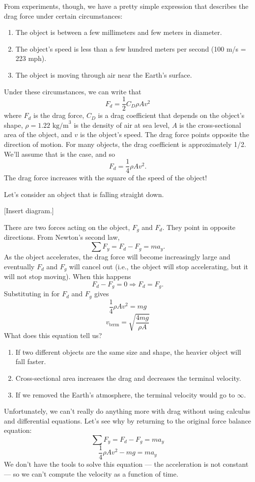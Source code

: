 From experiments, though, we have a pretty simple expression that describes the drag force under certain circumstances:
\begin{enumerate}
\item The object is between a few millimeters and few meters in diameter.
\item The object's speed is less than a few hundred meters per second (100 m/s = 223 mph).
\item The object is moving through air near the Earth's surface.
\end{enumerate}
Under these circumstances, we can write that
$$\boxed{F_d=\frac{1}{2}C_D\rho Av^2}$$
where $F_d$ is the drag force, $C_D$ is a drag coefficient that depends on the object's shape, $\rho=1.22\mbox{ kg/m}^3$ is the density of air at sea level, $A$ is the cross-sectional area of the object, and $v$ is the object's speed. The drag force points opposite the direction of motion. For many objects, the drag coefficient is approximately 1/2. We'll assume that is the case, and so
$$\boxed{F_d=\frac{1}{4}\rho Av^2}.$$
The drag force increases with the square of the speed of the object!

Let's consider an object that is falling straight down.

[Insert diagram.]
\vspace{5cm}

There are two forces acting on the object, $F_g$ and $F_d$. They point in opposite directions. From Newton's second law,
$$\sum F_y=F_d-F_g=ma_y.$$
As the object accelerates, the drag force will become increasingly large and eventually $F_d$ and $F_g$ will cancel out (i.e., the object will stop accelerating, but it will not stop moving). When this happens
$$F_d-F_g=0\Rightarrow F_d=F_g.$$
Substituting in for $F_d$ and $F_g$ gives
$$\frac{1}{4}\rho Av^2=mg$$
$$\boxed{v_{\mbox{term}}=\sqrt{\frac{4mg}{\rho A}}}$$
What does this equation tell us?
\begin{enumerate}
\item If two different objects are the same size and shape, the heavier object will fall faster.
\item Cross-sectional area increases the drag and decreases the terminal velocity.
\item If we removed the Earth's atmosphere, the terminal velocity would go to $\infty$.
\end{enumerate}

Unfortunately, we can't really do anything more with drag without using calculus and differential equations. Let's see why by returning to the original force balance equation:
$$\sum F_y=F_d-F_g=ma_y$$
$$\frac{1}{4}\rho Av^2-mg=ma_y$$
We don't have the tools to solve this equation --- the acceleration is not constant --- so we can't compute the velocity as a function of time.

